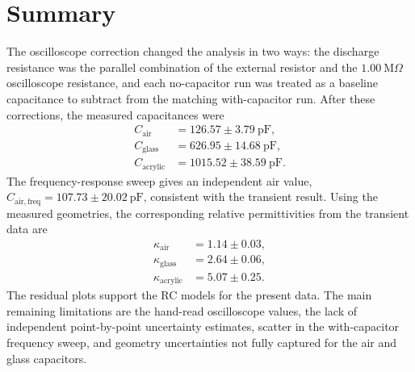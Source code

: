 \documentclass[letterpaper,12pt]{article}
\begin{document}
\section*{Summary}

The oscilloscope correction changed the analysis in two ways: the discharge resistance was the parallel combination of the external resistor and the $1.00~\mathrm{M}\Omega$ oscilloscope resistance, and each no-capacitor run was treated as a baseline capacitance to subtract from the matching with-capacitor run. After these corrections, the measured capacitances were
\begin{align}
    C_{\mathrm{air}} &= 126.57 \pm 3.79~\mathrm{pF},\\
    C_{\mathrm{glass}} &= 626.95 \pm 14.68~\mathrm{pF},\\
    C_{\mathrm{acrylic}} &= 1015.52 \pm 38.59~\mathrm{pF}.
\end{align}
The frequency-response sweep gives an independent air value, $C_{\mathrm{air,freq}}=107.73\pm20.02~\mathrm{pF}$, consistent with the transient result. Using the measured geometries, the corresponding relative permittivities from the transient data are
\begin{align}
    \kappa_{\mathrm{air}} &= 1.14 \pm 0.03,\\
    \kappa_{\mathrm{glass}} &= 2.64 \pm 0.06,\\
    \kappa_{\mathrm{acrylic}} &= 5.07 \pm 0.25.
\end{align}
The residual plots support the RC models for the present data. The main remaining limitations are the hand-read oscilloscope values, the lack of independent point-by-point uncertainty estimates, scatter in the with-capacitor frequency sweep, and geometry uncertainties not fully captured for the air and glass capacitors.
\end{document}
